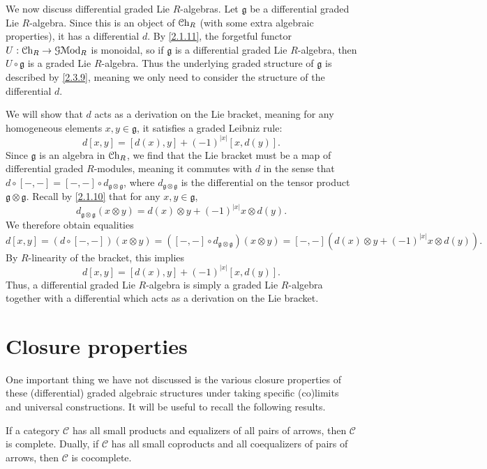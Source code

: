 \begin{discussion}\label{2.3.10}
	We now discuss differential graded Lie $R$-algebras. Let $\mathfrak{g} $ be a differential graded Lie $R$-algebra. Since this is an object of $\mathcal{C}\mathrm{h}_{R} $ (with some extra algebraic properties), it has a differential $d$. By \cref{2.1.11}, the forgetful functor $U : \mathcal{C}\mathrm{h}_{R}  \to \mathcal{G} \mathcal{M}\mathrm{od} _R$ is monoidal, so if $\mathfrak{g} $ is a differential graded Lie $R$-algebra, then $U\circ \mathfrak{g} $ is a graded Lie $R$-algebra. Thus the underlying graded structure of $\mathfrak{g} $ is described by \cref{2.3.9}, meaning we only need to consider the structure of the differential $d$.

	We will show that $d$ acts as a derivation on the Lie bracket, meaning for any homogeneous elements $x,y\in \mathfrak{g} $, it satisfies a graded Leibniz rule:
	\[
		d[x,y] = [d(x),y] + (-1)^{\left| x \right| } [x,d(y)]
	.\]
	Since $\mathfrak{g} $ is an algebra in $\mathcal{C}\mathrm{h}_{R} $, we find that the Lie bracket must be a map of differential graded $R$-modules, meaning it commutes with $d$ in the sense that $d\circ [-,-] = [-,-]\circ d_{\mathfrak{g} \otimes \mathfrak{g} } $, where $d_{\mathfrak{g} \otimes \mathfrak{g} } $ is the differential on the tensor product $\mathfrak{g} \otimes \mathfrak{g} $. Recall by \cref{2.1.10} that for any $x,y\in \mathfrak{g} $,
	\[
		d_{\mathfrak{g} \otimes \mathfrak{g} } (x\otimes y) = d(x)\otimes y + (-1)^{\left| x \right| } x\otimes d(y)
	.\]
	We therefore obtain equalities
	\[
		d[x,y] = (d\circ [-,-])(x\otimes y) = ([-,-]\circ d_{\mathfrak{g} \otimes \mathfrak{g} } )(x\otimes y) = [-,-]\left( d(x)\otimes y + (-1)^{\left| x \right| } x\otimes d(y) \right) 
	.\]
	By $R$-linearity of the bracket, this implies
	\[
		d[x,y] = [d(x),y] + (-1)^{\left| x \right| } [x,d(y)]
	.\]
	Thus, a differential graded Lie $R$-algebra is simply a graded Lie $R$-algebra together with a differential which acts as a derivation on the Lie bracket.
\end{discussion}

\section{Closure properties}

One important thing we have not discussed is the various closure properties of these (differential) graded algebraic structures under taking specific (co)limits and universal constructions. It will be useful to recall the following results.

\begin{proposition}\label{2.4.1}
	If a category $\mathcal{C} $ has all small products and equalizers of all pairs of arrows, then $\mathcal{C} $ is complete. Dually, if $\mathcal{C} $ has all small coproducts and all coequalizers of pairs of arrows, then $\mathcal{C} $ is cocomplete.
\end{proposition}

